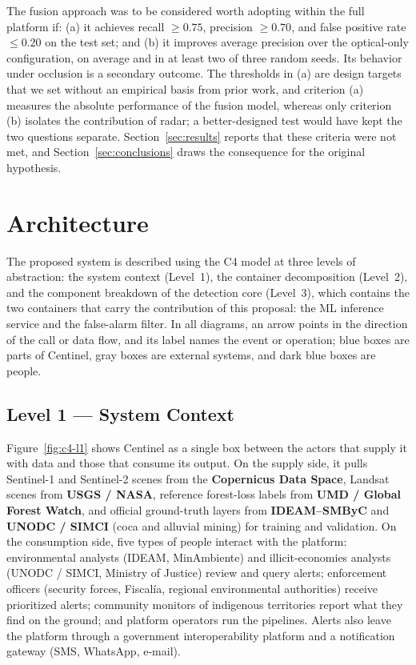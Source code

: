 \documentclass{article}
\begin{document}
The fusion approach was to be considered worth adopting within the full
platform if: (a) it achieves recall $\geq 0.75$, precision $\geq 0.70$, and
false positive rate $\leq 0.20$ on the test set; and (b) it improves average
precision over the optical-only configuration, on average and in at least two
of three random seeds.
Its behavior under
occlusion is a secondary outcome.
The thresholds in (a) are design targets that we set without an empirical basis
from prior work, and criterion (a) measures the absolute performance of the
fusion model, whereas only criterion (b) isolates the contribution of radar;
a better-designed test would have kept the two questions separate.
Section~\ref{sec:results} reports that these criteria were not met, and
Section~\ref{sec:conclusions} draws the consequence for the original hypothesis.


\section{Architecture}
\label{sec:architecture}

The proposed system is described using the C4 model at three levels of
abstraction: the system context (Level~1), the container decomposition
(Level~2), and the component breakdown of the detection core (Level~3), which
contains the two containers that carry the contribution of this proposal: the
ML inference service and the false-alarm filter.
In all diagrams, an arrow points in the direction of the call or data flow, and
its label names the event or operation; blue boxes are parts of Centinel,
gray boxes are external systems, and dark blue boxes are people.

\subsection{Level 1 --- System Context}

Figure~\ref{fig:c4-l1} shows Centinel as a single box between the actors that
supply it with data and those that consume its output.
On the supply side, it pulls Sentinel-1 and Sentinel-2 scenes from the
\textbf{Copernicus Data Space}, Landsat scenes from \textbf{USGS / NASA},
reference forest-loss labels from \textbf{UMD / Global Forest Watch}, and
official ground-truth layers from \textbf{IDEAM--SMByC} and
\textbf{UNODC / SIMCI} (coca and alluvial mining) for training and validation.
On the consumption side, five types of people interact with the platform:
environmental analysts (IDEAM, MinAmbiente) and illicit-economies analysts
(UNODC / SIMCI, Ministry of Justice) review and query alerts; enforcement
officers (security forces, Fiscal\'ia, regional environmental authorities)
receive prioritized alerts; community monitors of indigenous territories report
what they find on the ground; and platform operators run the pipelines.
Alerts also leave the platform through a government interoperability platform
and a notification gateway (SMS, WhatsApp, e-mail).
\end{document}

